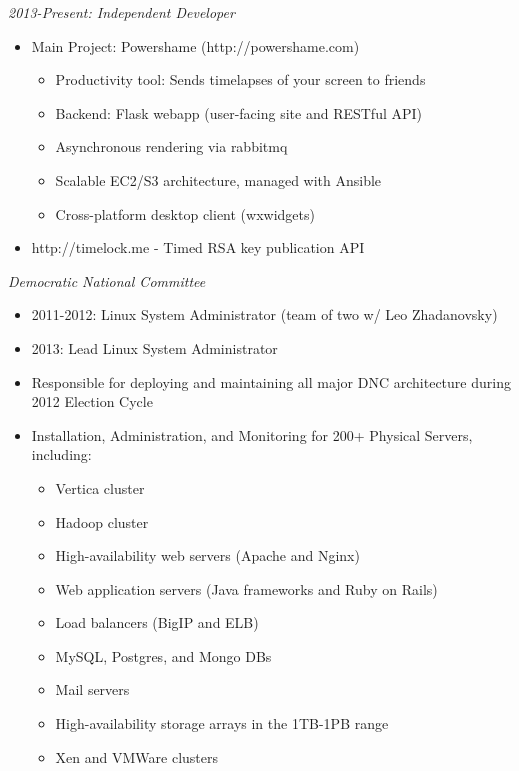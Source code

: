 \documentclass[11pt]{res} %
\begin{document}
\begin{resume}
{\sl 2013-Present: Independent Developer }
    \begin{itemize} 
        \item Main Project: Powershame (http://powershame.com)
        \begin{itemize}
            \item Productivity tool: Sends timelapses of your screen to friends
            \item Backend: Flask webapp (user-facing site and RESTful API)
            \item Asynchronous rendering via rabbitmq
            \item Scalable EC2/S3 architecture, managed with Ansible
            \item Cross-platform desktop client (wxwidgets)
        \end{itemize}
    \item http://timelock.me - Timed RSA key publication API
    \end{itemize}
{\sl Democratic National Committee} 
        \begin{itemize}
            \item 2011-2012: Linux System Administrator (team of two w/ Leo Zhadanovsky)
            \item 2013: Lead Linux System Administrator
            \item Responsible for deploying and maintaining all major DNC architecture during 2012 Election Cycle
            \item Installation, Administration, and Monitoring for 200+ Physical Servers, including:
                \begin{itemize}
                    \item Vertica cluster
                    \item Hadoop cluster
                    \item High-availability web servers (Apache and Nginx)
                    \item Web application servers (Java frameworks and Ruby on Rails)
                    \item Load balancers (BigIP and ELB)
                    \item MySQL, Postgres, and Mongo DBs
                    \item Mail servers
                    \item High-availability storage arrays in the 1TB-1PB range
                    \item Xen and VMWare clusters

\end{itemize}
\end{itemize}
\end{resume}
\end{document}

